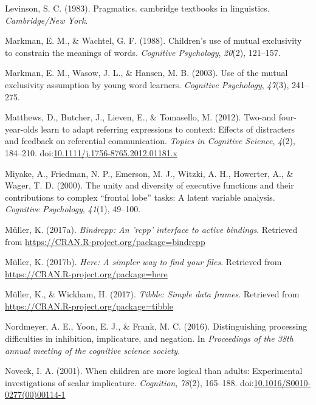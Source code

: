 \documentclass[man]{apa6}
\theoremstyle{definition}
\theoremstyle{definition}
\theoremstyle{definition}
\theoremstyle{remark}
\begin{document}
\hypertarget{ref-levinson1983}{}
Levinson, S. C. (1983). Pragmatics. cambridge textbooks in linguistics.
\emph{Cambridge/New York}.

\hypertarget{ref-markman1988children}{}
Markman, E. M., \& Wachtel, G. F. (1988). Children's use of mutual
exclusivity to constrain the meanings of words. \emph{Cognitive
Psychology}, \emph{20}(2), 121--157.

\hypertarget{ref-markman2003use}{}
Markman, E. M., Wasow, J. L., \& Hansen, M. B. (2003). Use of the mutual
exclusivity assumption by young word learners. \emph{Cognitive
Psychology}, \emph{47}(3), 241--275.

\hypertarget{ref-matthews2012}{}
Matthews, D., Butcher, J., Lieven, E., \& Tomasello, M. (2012). Two-and
four-year-olds learn to adapt referring expressions to context: Effects
of distracters and feedback on referential communication. \emph{Topics
in Cognitive Science}, \emph{4}(2), 184--210.
doi:\href{https://doi.org/10.1111/j.1756-8765.2012.01181.x}{10.1111/j.1756-8765.2012.01181.x}

\hypertarget{ref-miyake2000unity}{}
Miyake, A., Friedman, N. P., Emerson, M. J., Witzki, A. H., Howerter,
A., \& Wager, T. D. (2000). The unity and diversity of executive
functions and their contributions to complex ``frontal lobe'' tasks: A
latent variable analysis. \emph{Cognitive Psychology}, \emph{41}(1),
49--100.

\hypertarget{ref-R-bindrcpp}{}
Müller, K. (2017a). \emph{Bindrcpp: An 'rcpp' interface to active
bindings}. Retrieved from
\url{https://CRAN.R-project.org/package=bindrcpp}

\hypertarget{ref-R-here}{}
Müller, K. (2017b). \emph{Here: A simpler way to find your files}.
Retrieved from \url{https://CRAN.R-project.org/package=here}

\hypertarget{ref-R-tibble}{}
Müller, K., \& Wickham, H. (2017). \emph{Tibble: Simple data frames}.
Retrieved from \url{https://CRAN.R-project.org/package=tibble}

\hypertarget{ref-nordmeyer2016}{}
Nordmeyer, A. E., Yoon, E. J., \& Frank, M. C. (2016). Distinguishing
processing difficulties in inhibition, implicature, and negation. In
\emph{Proceedings of the 38th annual meeting of the cognitive science
society}.

\hypertarget{ref-noveck2001}{}
Noveck, I. A. (2001). When children are more logical than adults:
Experimental investigations of scalar implicature. \emph{Cognition},
\emph{78}(2), 165--188.
doi:\href{https://doi.org/10.1016/S0010-0277(00)00114-1}{10.1016/S0010-0277(00)00114-1}
\end{document}
